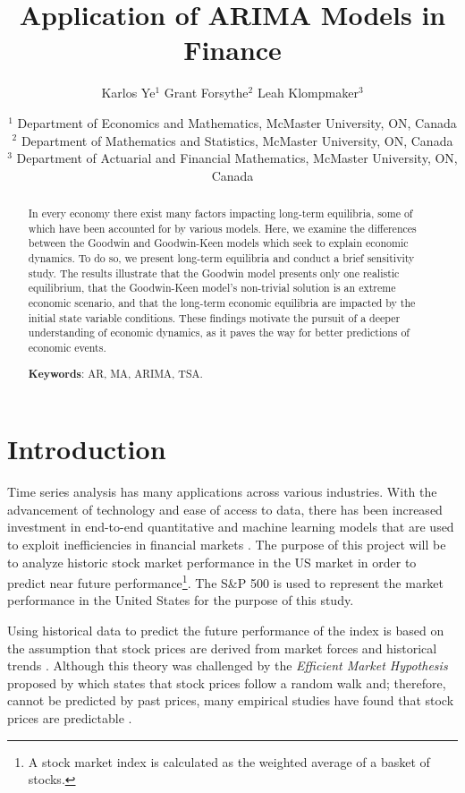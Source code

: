 \documentclass[12pt, centerh1]{article}
\title{Application of ARIMA Models in Finance} %
\author{\qquad Karlos Ye$^{1}$ \qquad Grant Forsythe$^{2}$ \qquad Leah Klompmaker$^{3}$}
\date{
{\footnotesize $^1$ Department of Economics and Mathematics, McMaster University, ON, Canada\\[-6pt]
               $^2$ Department of Mathematics and Statistics, McMaster University, ON, Canada\\[-6pt]
               $^3$ Department of Actuarial and Financial Mathematics, McMaster University, ON, Canada\\[-6pt]}
}
\begin{document}
\maketitle
\vspace{-8mm} %
\begin{abstract}
In every economy there exist many factors impacting long-term equilibria, some of which have been accounted for by various models. 
Here, we examine the differences between the Goodwin and Goodwin-Keen models which seek to explain economic dynamics. To do so, we present long-term equilibria and conduct a brief sensitivity study. The results illustrate that the Goodwin model presents only one realistic equilibrium, that the Goodwin-Keen model's non-trivial solution is an extreme economic scenario, and that the long-term economic equilibria are impacted by the initial state variable conditions. These findings motivate the pursuit of a deeper understanding of economic dynamics, as it paves the way for better predictions of economic events.

\noindent\textbf{Keywords}: AR, MA, ARIMA, TSA.


\end{abstract}
\newpage

\section{Introduction} \label{introduction}
Time series analysis has many applications across various industries. With the advancement of technology and ease of access to data, there has been increased investment in end-to-end quantitative and machine learning models that are used to exploit inefficiencies in financial markets \citep{coqueret2021machine}. The purpose of this project will be to analyze historic stock market performance in the US market in order to predict near future performance\footnote{A stock market index is calculated as the weighted average of a basket of stocks.}. The S\&P 500 is used to represent the market performance in the United States for the purpose of this study. 

Using historical data to predict the future performance of the index is based on the assumption that stock prices are derived from market forces and historical trends \citep{levy1967relative}. Although this theory was challenged by the \textit{Efficient Market Hypothesis} proposed by \citet{emh} which states that stock prices follow a random walk and; therefore, cannot be predicted by past prices, many empirical studies have found that stock prices are predictable \citep{malkiel2003efficient}.
\end{document}
